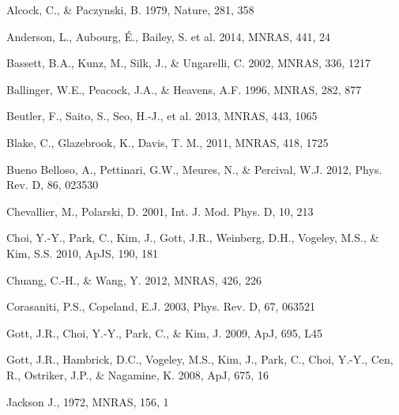 \documentclass[useAMS,usenatbib]{mn2e}
\begin{document}
\begin{thebibliography}{}

Alcock, C., \& Paczynski, B. 1979, Nature, 281, 358  

Anderson, L., Aubourg, \'E., Bailey, S. et al. 2014, MNRAS, 441, 24  


Bassett, B.A., Kunz, M., Silk, J., \& Ungarelli, C. 2002, MNRAS, 336, 1217

Ballinger, W.E., Peacock, J.A., \& Heavens, A.F. 1996, MNRAS, 282, 877  


Beutler, F., Saito, S., Seo, H.-J., et al. 2013, MNRAS, 443, 1065

Blake, C., Glazebrook, K., Davis, T. M., 2011, MNRAS, 418, 1725  


Bueno Belloso, A., Pettinari, G.W., Meures, N., \& Percival, W.J. 2012, Phys. Rev. D, 86, 023530

Chevallier, M., Polarski, D. 2001, Int. J. Mod. Phys. D, 10, 213


Choi, Y.-Y., Park, C., Kim, J., Gott, J.R., 
Weinberg, D.H., Vogeley, M.S., \& Kim, S.S. 2010, ApJS, 190, 181  


Chuang, C.-H., \& Wang, Y. 2012, MNRAS, 426, 226  

Corasaniti, P.S., Copeland, E.J. 2003, Phys. Rev. D, 67, 063521


Gott, J.R., Choi, Y.-Y., Park, C., \& Kim, J. 2009, ApJ, 695, L45  

Gott, J.R., Hambrick, D.C., Vogeley, M.S., Kim, J., Park, C., Choi, Y.-Y.,
Cen, R., Ostriker, J.P., \& Nagamine, K. 2008, ApJ, 675, 16  

Jackson J., 1972, MNRAS, 156, 1


\end{thebibliography}
\end{document}
